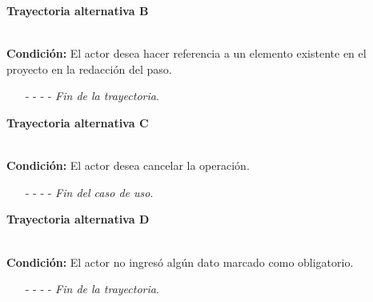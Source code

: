 \hypertarget{CU12-1-1-1-1-1:TAB}{\textbf{Trayectoria alternativa B}}\\
\noindent \textbf{Condición:} El actor desea hacer referencia a un elemento existente en el proyecto en la redacción del paso.
\begin{enumerate}
	\UCpaso[\UCactor] Ingresa el token correspondiente al elemento a referenciar.
	\UCpaso[\UCsist] Verifica que los tokens utilizados se encuentren correctamente estructurados, con base en la regla de negocio . 
	\UCpaso[\UCsist] Obtiene los \hyperlink{tElemento}{elementos} registrados en el proyecto correspondientes al token ingresado. 
	\UCpaso[\UCsist] Muestra una lista con los \hyperlink{tElemento}{elementos} encontrados.
	\UCpaso[\UCactor] Selecciona un elemento de la lista.
	\UCpaso[\UCsist] Verifica que el nombre del elemento seleccionado no contenga espacios. \hyperlink{CU12-1-1-1-1-1:TAG}{[Trayectoria G]}
	\UCpaso[\UCsist] Agrega la referencia del elemento al texto. \label{CU12.1.1.1.1.1-TA1}
	\UCpaso Continúa en el paso \ref{CU12.1.1.1.1.1-P6} de la trayectoria principal.
	\item[- -] - - {\em {Fin de la trayectoria}}.%
\end{enumerate}
\hypertarget{CU12-1-1-1-1-1:TAC}{\textbf{Trayectoria alternativa C}}\\
\noindent \textbf{Condición:} El actor desea cancelar la operación.
\begin{enumerate}
	\UCpaso[\UCactor] Solicita cancelar la operación oprimiendo el botón  de la pantalla .
	\UCpaso[\UCsist] Muestra la pantalla .
	\item[- -] - - {\em {Fin del caso de uso}}.%
\end{enumerate}
\hypertarget{CU12-1-1-1-1-1:TAD}{\textbf{Trayectoria alternativa D}}\\
\noindent \textbf{Condición:} El actor no ingresó algún dato marcado como obligatorio.
\begin{enumerate}
	\UCpaso[\UCsist] Muestra el mensaje  señalando el campo que presenta el error en la pantalla .
	\UCpaso Regresa al paso \ref{CU12.1.1.1.1.1-P5} de la trayectoria principal.
	\item[- -] - - {\em {Fin de la trayectoria}}.%
\end{enumerate}
